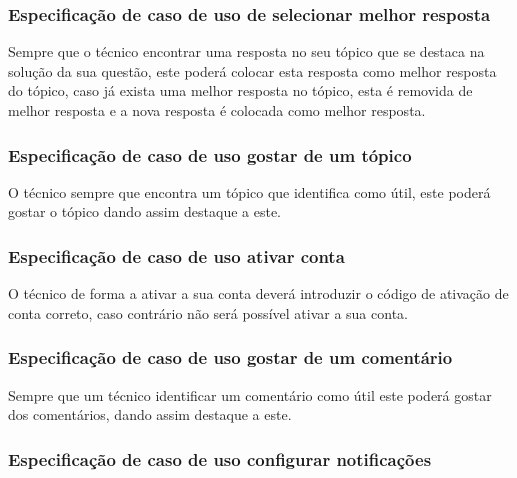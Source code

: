 

\newpage

\subsubsection{Especificação de caso de uso de selecionar melhor resposta}

Sempre que o técnico encontrar uma resposta no seu tópico que se destaca na solução da sua questão, 
este poderá colocar esta resposta como melhor resposta do tópico, caso já exista uma melhor resposta no 
tópico, esta é removida de melhor resposta e a nova resposta é colocada como melhor resposta.



\newpage

\subsubsection{Especificação de caso de uso gostar de um tópico}

O técnico sempre que encontra um tópico que identifica como útil, este poderá gostar o tópico dando assim 
destaque a este.





\subsubsection{Especificação de caso de uso ativar conta}

O técnico de forma a ativar a sua conta deverá introduzir o código de ativação de conta correto, 
caso contrário não será possível ativar a sua conta.



\newpage

\subsubsection{Especificação de caso de uso gostar de um comentário}

Sempre que um técnico identificar um comentário como útil este poderá gostar dos comentários, dando 
assim destaque a este.



\subsubsection{Especificação de caso de uso configurar notificações}

